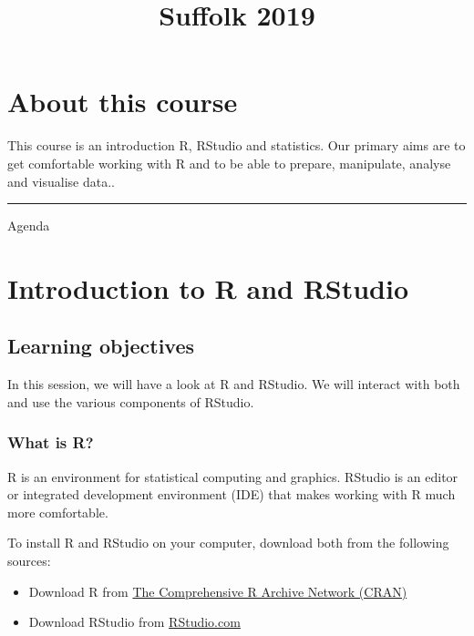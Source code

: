 \documentclass[]{article}
\title{Suffolk 2019}
\author{}
\date{}
\providecommand{\tightlist}{%
  \setlength{\itemsep}{0pt}\setlength{\parskip}{0pt}}
\begin{document}
\maketitle

{
\setcounter{tocdepth}{2}
\tableofcontents
}
\hypertarget{about-this-course}{%
\section*{About this course}\label{about-this-course}}

This course is an introduction R, RStudio and statistics. Our primary aims are to get comfortable working with R and to be able to prepare, manipulate, analyse and visualise data..

\begin{center}\rule{0.5\linewidth}{\linethickness}\end{center}

Agenda

\hypertarget{introduction-to-r-and-rstudio}{%
\section{Introduction to R and RStudio}\label{introduction-to-r-and-rstudio}}

\hypertarget{learning-objectives}{%
\subsection{Learning objectives}\label{learning-objectives}}

In this session, we will have a look at R and RStudio. We will interact with both and use the various components of RStudio.

\hypertarget{what-is-r}{%
\subsubsection{What is R?}\label{what-is-r}}

R is an environment for statistical computing and graphics. RStudio is an editor or integrated development environment (IDE) that makes working with R much more comfortable.

To install R and RStudio on your computer, download both from the following sources:

\begin{itemize}
\tightlist
\item
  Download R from \href{https://cran.r-project.org}{The Comprehensive R Archive Network (CRAN)}
\item
  Download RStudio from \href{https://www.rstudio.com}{RStudio.com}
\end{itemize}
\end{document}
